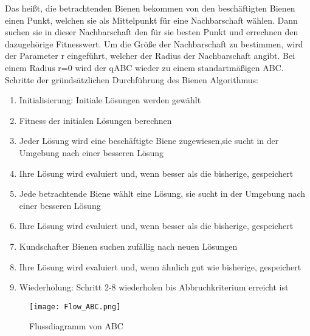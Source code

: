 Das heißt, die betrachtenden Bienen bekommen von den beschäftigten Bienen einen Punkt, welchen sie als Mittelpunkt für eine Nachbarschaft wählen. Dann suchen sie in dieser Nachbarschaft den für sie besten Punkt und errechnen den dazugehörige Fitnesswert. Um die Größe der Nachbarschaft zu bestimmen, wird der Parameter r eingeführt, welcher der Radius der Nachbarschaft angibt. Bei einem Radius r=0 wird der qABC wieder zu einem standartmäßigen ABC.
\\
Schritte der gründsätzlichen Durchführung des Bienen Algorithmus:
\begin{enumerate}
  \item Initialisierung: Initiale Lösungen werden gewählt 
  \item Fitness der initialen Lösungen berechnen
  \item Jeder Lösung wird eine beschäftigte Biene zugewiesen,sie sucht in der Umgebung nach einer besseren Lösung
  \item Ihre Lösung wird evaluiert und, wenn besser als die bisherige, gespeichert
  \item Jede betrachtende Biene wählt eine Lösung, sie sucht in der Umgebung nach einer besseren Lösung
  \item Ihre Lösung wird evaluiert und, wenn besser als die bisherige, gespeichert
  \item Kundschafter Bienen suchen zufällig nach neuen Lösungen
  \item Ihre Lösung wird evaluiert und, wenn ähnlich gut wie bisherige, gespeichert
  \item Wiederholung: Schritt 2-8 wiederholen bis Abbruchkriterium erreicht ist
\end{enumerate}

\begin{figure}
  \centering
  \texttt{[image: Flow\_ABC.png]}
  \caption{Flussdiagramm von ABC}
  \label{fig:Figure_ABC}
\end{figure}
